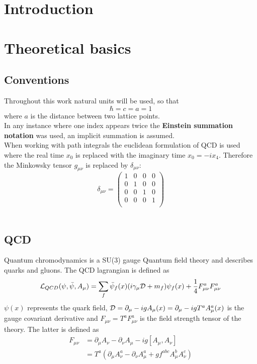 \documentclass{style}
\begin{document}
    \section{Introduction}
    
	\section{Theoretical basics}
	\subsection{Conventions}
	Throughout this work natural units will be used, so that
	$$\hbar = c = a = 1$$
	where $a$ is the distance between two lattice points.\\
	
	In any instance where one index appears twice the \textbf{Einstein summation notation} was used, an implicit summation is assumed.\\
	
	When working with path integrals the euclidean formulation of QCD is used where the real time $x_0$ is replaced with the imaginary time $x_0 = -ix_4$. Therefore the Minkowsky tensor $g_{\mu\nu}$ is replaced by $\delta_{\mu\nu}$:
	$$\delta_{\mu\nu} = 
	\begin{pmatrix}
	1 & 0 & 0 & 0 \\
	0 & 1 & 0 & 0 \\
	0 & 0 & 1 & 0 \\
	0 & 0 & 0 & 1 \\
	\end{pmatrix}
	$$\\
	\cite{Rothe2012}
	
	\subsection{QCD}
	Quantum chromodynamics is a SU(3) gauge Quantum field theory and describes quarks and gluons. The QCD lagrangian is defined as \cite{qcd1_script_philipsen}
	\begin{equation}
	    \mathcal{L}_{QCD}(\psi,\bar{\psi},A_\mu) = \sum_f \bar{\psi}_f(x)(i\gamma_\mu\mathcal{D} + m_f)\psi_f(x) + \frac{1}{4}F^a_{\mu\nu}F^a_{\mu\nu}
	    \label{qcd_lagrangian}
	\end{equation}
	$\psi(x)$ represents the quark field, $\mathcal{D} = \partial_\mu - igA_\mu(x) = \partial_\mu-igT^aA^a_\mu(x)$ is the gauge covariant derivative and $F_{\mu\nu} = T^aF^a_{\mu\nu}$ is the field strength tensor of the theory. The latter is defined as
	\begin{equation}\label{strenth_tensor}
	\begin{aligned}
	    F_{\mu\nu} &= \partial_\mu A_\nu - \partial_\nu A_\mu-ig[A_\mu,A_\nu]\\
	    &= T^a(\partial_\mu A^a_\nu - \partial_\nu A^a_\mu + g f^{abc}A^b_\mu A^c_\nu)
	\end{aligned}
	\end{equation}
	
\end{document}
